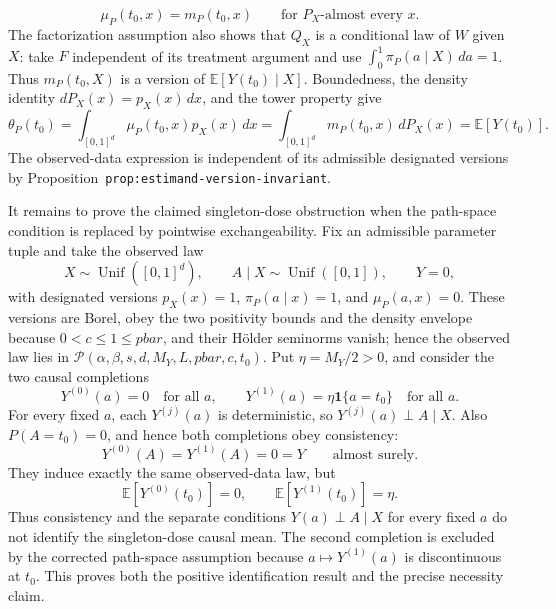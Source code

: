 \[
\mu_P(t_0,x)=m_P(t_0,x)
\qquad\text{for }P_X\text{-almost every }x.
\]
The factorization assumption also shows that \(Q_X\) is a conditional law of \(W\) given \(X\): take \(F\) independent of its treatment argument and use \(\int_0^1\pi_P(a\mid X)\,da=1\). Thus \(m_P(t_0,X)\) is a version of \(\mathbb E[Y(t_0)\mid X]\). Boundedness, the density identity \(dP_X(x)=p_X(x)\,dx\), and the tower property give
\[
\theta_P(t_0)
=\int_{[0,1]^d}\mu_P(t_0,x)p_X(x)\,dx
=\int_{[0,1]^d}m_P(t_0,x)\,dP_X(x)
=\mathbb E[Y(t_0)].
\]
The observed-data expression is independent of its admissible designated versions by Proposition~\texttt{prop:estimand-version-invariant}.

It remains to prove the claimed singleton-dose obstruction when the path-space condition is replaced by pointwise exchangeability. Fix an admissible parameter tuple and take the observed law
\[
X\sim\operatorname{Unif}([0,1]^d),
\qquad A\mid X\sim\operatorname{Unif}([0,1]),
\qquad Y=0,
\]
with designated versions \(p_X(x)=1\), \(\pi_P(a\mid x)=1\), and \(\mu_P(a,x)=0\). These versions are Borel, obey the two positivity bounds and the density envelope because \(0<c\le1\le pbar\), and their H\"older seminorms vanish; hence the observed law lies in \(\mathcal P(\alpha,\beta,s,d,M_Y,L,pbar,c,t_0)\). Put \(\eta=M_Y/2>0\), and consider the two causal completions
\[
Y^{(0)}(a)=0\quad\text{for all }a,
\qquad
Y^{(1)}(a)=\eta\mathbf 1\{a=t_0\}\quad\text{for all }a.
\]
For every fixed \(a\), each \(Y^{(j)}(a)\) is deterministic, so \(Y^{(j)}(a)\perp A\mid X\). Also \(P(A=t_0)=0\), and hence both completions obey consistency:
\[
Y^{(0)}(A)=Y^{(1)}(A)=0=Y
\qquad\text{almost surely}.
\]
They induce exactly the same observed-data law, but
\[
\mathbb E[Y^{(0)}(t_0)]=0,
\qquad
\mathbb E[Y^{(1)}(t_0)]=\eta.
\]
Thus consistency and the separate conditions \(Y(a)\perp A\mid X\) for every fixed \(a\) do not identify the singleton-dose causal mean. The second completion is excluded by the corrected path-space assumption because \(a\mapsto Y^{(1)}(a)\) is discontinuous at \(t_0\). This proves both the positive identification result and the precise necessity claim.